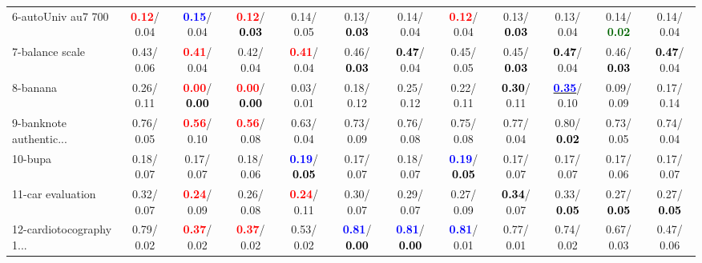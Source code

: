 \begin{table}[h]
\begin{center}
{\begin{tabular}{lc|c|c|c|c|c|c|c|c|c|c}
6-autoUniv au7 700 & \textcolor{red}{\textbf{  0.12}}/  0.04 & \textcolor{blue}{\textbf{  0.15}}/  0.04 & \textcolor{red}{\textbf{  0.12}}/\textcolor{black}{\textbf{  0.03}} &   0.14/  0.05 &   0.13/\textcolor{black}{\textbf{  0.03}} &   0.14/  0.04 & \textcolor{red}{\textbf{  0.12}}/  0.04 &   0.13/\textcolor{black}{\textbf{  0.03}} &   0.13/  0.04 &   0.14/\textcolor{darkgreen}{\textbf{  0.02}} &   0.14/  0.04 \\
7-balance scale &   0.43/  0.06 & \textcolor{red}{\textbf{  0.41}}/  0.04 &   0.42/  0.04 & \textcolor{red}{\textbf{  0.41}}/  0.04 &   0.46/\textcolor{black}{\textbf{  0.03}} & \textcolor{black}{\textbf{  0.47}}/  0.04 &   0.45/  0.05 &   0.45/\textcolor{black}{\textbf{  0.03}} & \textcolor{black}{\textbf{  0.47}}/  0.04 &   0.46/\textcolor{black}{\textbf{  0.03}} & \textcolor{black}{\textbf{  0.47}}/  0.04 \\ \hline
8-banana &   0.26/  0.11 & \textcolor{red}{\textbf{  0.00}}/\textcolor{black}{\textbf{  0.00}} & \textcolor{red}{\textbf{  0.00}}/\textcolor{black}{\textbf{  0.00}} &   0.03/  0.01 &   0.18/  0.12 &   0.25/  0.12 &   0.22/  0.11 & \textcolor{black}{\textbf{  0.30}}/  0.11 & \underline{\textcolor{blue}{\textbf{  0.35}}}/  0.10 &   0.09/  0.09 &   0.17/  0.14 \\
9-banknote authentic... &   0.76/  0.05 & \textcolor{red}{\textbf{  0.56}}/  0.10 & \textcolor{red}{\textbf{  0.56}}/  0.08 &   0.63/  0.04 &   0.73/  0.09 &   0.76/  0.08 &   0.75/  0.08 &   0.77/  0.04 &   0.80/\textcolor{black}{\textbf{  0.02}} &   0.73/  0.05 &   0.74/  0.04 \\
10-bupa &   0.18/  0.07 &   0.17/  0.07 &   0.18/  0.06 & \textcolor{blue}{\textbf{  0.19}}/\textcolor{black}{\textbf{  0.05}} &   0.17/  0.07 &   0.18/  0.07 & \textcolor{blue}{\textbf{  0.19}}/\textcolor{black}{\textbf{  0.05}} &   0.17/  0.07 &   0.17/  0.07 &   0.17/  0.06 &   0.17/  0.07 \\
11-car evaluation &   0.32/  0.07 & \textcolor{red}{\textbf{  0.24}}/  0.09 &   0.26/  0.08 & \textcolor{red}{\textbf{  0.24}}/  0.11 &   0.30/  0.07 &   0.29/  0.07 &   0.27/  0.09 & \textcolor{black}{\textbf{  0.34}}/  0.07 &   0.33/\textcolor{black}{\textbf{  0.05}} &   0.27/\textcolor{black}{\textbf{  0.05}} &   0.27/\textcolor{black}{\textbf{  0.05}} \\
12-cardiotocography 1... &   0.79/  0.02 & \textcolor{red}{\textbf{  0.37}}/  0.02 & \textcolor{red}{\textbf{  0.37}}/  0.02 &   0.53/  0.02 & \textcolor{blue}{\textbf{  0.81}}/\textcolor{black}{\textbf{  0.00}} & \textcolor{blue}{\textbf{  0.81}}/\textcolor{black}{\textbf{  0.00}} & \textcolor{blue}{\textbf{  0.81}}/  0.01 &   0.77/  0.01 &   0.74/  0.02 &   0.67/  0.03 &   0.47/  0.06 \\

\end{tabular}}
\end{center}
\end{table}
